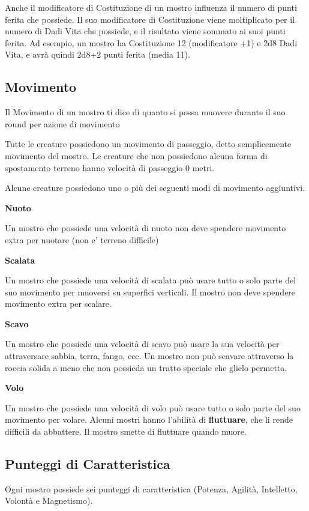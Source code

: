 Anche il modificatore di Costituzione di un mostro influenza il numero
di punti ferita che possiede. Il suo modificatore di Costituzione viene
moltiplicato per il numero di Dadi Vita che possiede, e il risultato
viene sommato ai suoi punti ferita. Ad esempio, un mostro ha
Costituzione 12 (modificatore +1) e 2d8 Dadi Vita, e avrà quindi 2d8+2
punti ferita (media 11).

\subsection{Movimento}

Il Movimento di un mostro ti dice di quanto si possa muovere durante il suo round per azione di movimento

Tutte le creature possiedono un movimento di passeggio, detto semplicemente movimento del mostro. Le creature che non possiedono alcuna forma di spostamento terreno hanno velocità di passeggio 0 metri.

Alcune creature possiedono uno o più dei seguenti modi di movimento aggiuntivi.

\medskip\textbf{Nuoto}

Un mostro che possiede una velocità di nuoto non deve spendere movimento extra per nuotare (non e' terreno difficile)

\medskip\textbf{Scalata}

Un mostro che possiede una velocità di scalata può usare tutto o solo parte del suo movimento per muoversi su superfici verticali. Il mostro non deve spendere movimento extra per scalare.

\medskip\textbf{Scavo}

Un mostro che possiede una velocità di scavo può usare la sua velocità per attraversare sabbia, terra, fango, ecc. Un mostro non può scavare attraverso la roccia solida a meno che non possieda un tratto speciale che glielo permetta.

\medskip\textbf{Volo}

Un mostro che possiede una velocità di volo può usare tutto o solo parte del suo movimento per volare. Alcuni mostri hanno l'abilità di \textbf{fluttuare}, che li rende difficili da abbattere. Il mostro smette di fluttuare quando muore.

\subsection{Punteggi di Caratteristica}

Ogni mostro possiede sei punteggi di caratteristica (Potenza, Agilità, Intelletto, Volontà e Magnetismo).

